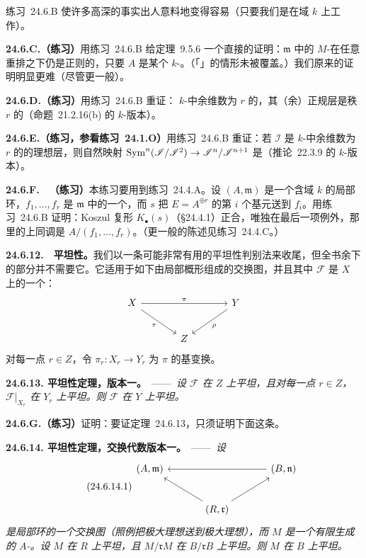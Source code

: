 \mbox{练习~24.6.B} 使许多高深的事实出人意料地变得容易（只要我们是在域 $k$ 上工作）。

\textbf{24.6.C.（练习）}\quad 用\mbox{练习~24.6.B} 给\mbox{定理~9.5.6} 一个直接的证明：$\mathfrak{m}$ 中的 $M$-\trRegularSequence{}在任意重排之下仍是正则的，只要 $A$ 是某个 $k$-\trAlgebra。（「\trMixedCharacteristic」的情形未被覆盖。）我们原来的证明明显更难（尽管更一般）。

\textbf{24.6.D.（练习）}\quad 用\mbox{练习~24.6.B} 重证：\trNoether{} $k$-\trScheme{}中余维数为 $r$ 的\trRegularEmbedding，其（余）正规层是秩 $r$ 的\trLocallyFreeSheaf（\mbox{命题~21.2.16}(b) 的 $k$-\trScheme{}版本）。

\textbf{24.6.E.（练习，参看\mbox{练习~24.1.O}）}\quad 用\mbox{练习~24.6.B} 重证：若 $\mathscr{I}$ 是\trNoether{} $k$-\trScheme{}中余维数为 $r$ 的\trRegularEmbedding{}的理想层，则自然映射 $\operatorname{Sym}^n(\mathscr{I}/\mathscr{I}^2)\to\mathscr{I}^n/\mathscr{I}^{n+1}$ 是\trIsomorphism（\mbox{推论~22.3.9} 的 $k$-\trScheme{}版本）。

\textbf{24.6.F.}\ \extrahard\ \textbf{（练习）}\quad 本练习要用到\mbox{练习~24.4.A}。设 $(A,\mathfrak{m})$ 是一个含域 $k$ 的\trNoether{}局部环，$f_1,\dots,f_r$ 是 $\mathfrak{m}$ 中的一个\trRegularSequence，而 $s$ 把 $E=A^{\oplus r}$ 的第 $i$ 个基元送到 $f_i$。用\mbox{练习~24.6.B} 证明：Koszul 复形 $K_\bullet(s)$（\S24.4.1）正合，唯独在最后一项例外，那里的上同调是 $A/(f_1,\dots,f_r)$。（更一般的陈述见\mbox{练习~24.4.C}。）

\textbf{24.6.12.}\ \extrahard\ \textbf{\trFiber{}平坦性。}\quad 我们以一条可能非常有用的平坦性判别法来收尾，但全书余下的部分并不需要它。它适用于如下由局部\trNoether{}概形组成的交换图，并且其中 $\mathscr{F}$ 是 $X$ 上的一个\trCoherentSheaf：
\[
\begin{tikzcd}[row sep=2.2em, column sep=3.6em]
X \ar[rr, "\pi"] \ar[dr, "\tau"'] & & Y \ar[dl, "\rho"] \\
& Z &
\end{tikzcd}
\]
对每一点 $r\in Z$，令 $\pi_r\colon X_r\to Y_r$ 为 $\pi$ 的基变换。

\textbf{24.6.13. \trFiber{}平坦性定理，版本一。}\ ——\ \emph{设 $\mathscr{F}$ 在 $Z$ 上平坦，且对每一点 $r\in Z$，$\mathscr{F}|_{X_r}$ 在 $Y_r$ 上平坦。则 $\mathscr{F}$ 在 $Y$ 上平坦。}

\textbf{24.6.G.（练习）}\quad 证明：要证\mbox{定理~24.6.13}，只须证明下面这条。

\textbf{24.6.14. \trFiber{}平坦性定理，交换代数版本一。}\ ——\ \emph{设}
\begin{equation*}
\tag{24.6.14.1}\label{eq:fibral-flatness-diagram}
\begin{tikzcd}[row sep=2.4em, column sep=3.4em]
(A,\mathfrak{m}) & & (B,\mathfrak{n}) \ar[ll] \\
& (R,\mathfrak{r}) \ar[ul] \ar[ur]
\end{tikzcd}
\end{equation*}
\emph{是\trNoether{}局部环的一个交换图（照例把极大理想送到极大理想），而 $M$ 是一个有限生成的 $A$-\trModule。设 $M$ 在 $R$ 上平坦，且 $M/\mathfrak{r}M$ 在 $B/\mathfrak{r}B$ 上平坦。则 $M$ 在 $B$ 上平坦。}

